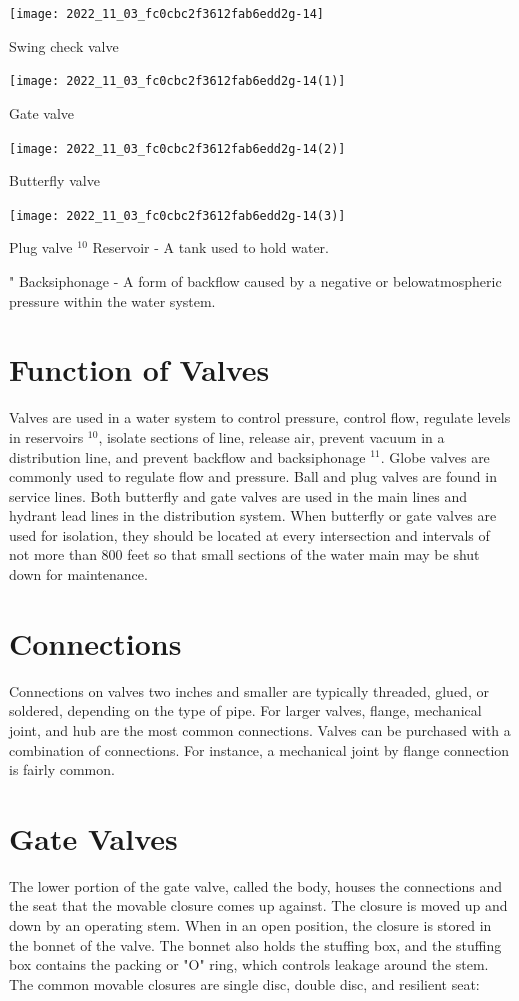 \documentclass[10pt]{article}
\begin{document}
\texttt{[image: 2022\_11\_03\_fc0cbc2f3612fab6edd2g-14]}

Swing check valve

\texttt{[image: 2022\_11\_03\_fc0cbc2f3612fab6edd2g-14(1)]}

Gate valve

\texttt{[image: 2022\_11\_03\_fc0cbc2f3612fab6edd2g-14(2)]}

Butterfly valve

\texttt{[image: 2022\_11\_03\_fc0cbc2f3612fab6edd2g-14(3)]}

Plug valve ${ }^{10}$ Reservoir - A tank used to hold water.

" Backsiphonage - A form of backflow caused by a negative or belowatmospheric pressure within the water system.

\section{Function of Valves}
Valves are used in a water system to control pressure, control flow, regulate levels in reservoirs $^{10}$, isolate sections of line, release air, prevent vacuum in a distribution line, and prevent backflow and backsiphonage ${ }^{11}$. Globe valves are commonly used to regulate flow and pressure. Ball and plug valves are found in service lines. Both butterfly and gate valves are used in the main lines and hydrant lead lines in the distribution system. When butterfly or gate valves are used for isolation, they should be located at every intersection and intervals of not more than 800 feet so that small sections of the water main may be shut down for maintenance.

\section{Connections}
Connections on valves two inches and smaller are typically threaded, glued, or soldered, depending on the type of pipe. For larger valves, flange, mechanical joint, and hub are the most common connections. Valves can be purchased with a combination of connections. For instance, a mechanical joint by flange connection is fairly common.

\section{Gate Valves}
The lower portion of the gate valve, called the body, houses the connections and the seat that the movable closure comes up against. The closure is moved up and down by an operating stem. When in an open position, the closure is stored in the bonnet of the valve. The bonnet also holds the stuffing box, and the stuffing box contains the packing or "O" ring, which controls leakage around the stem. The common movable closures are single disc, double disc, and resilient seat:
\end{document}

